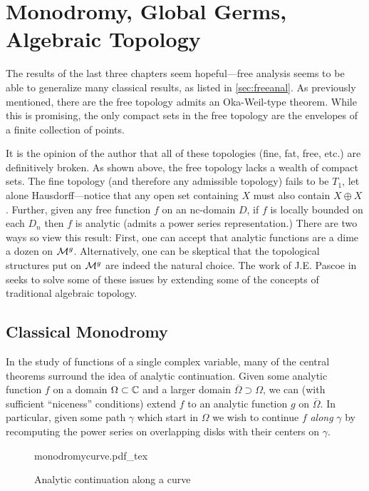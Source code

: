 \chapter{Monodromy, Global Germs, Algebraic Topology}\label{ch:monodromy}

The results of the last three chapters seem hopeful---free analysis seems to be
able to generalize many classical results, as listed in \cref{sec:freeanal}. As
previously mentioned, there are the free topology admits an Oka-Weil-type theorem.
While this is promising, the only compact sets in the free topology are the
envelopes of a finite collection of points.

It is the opinion of the author that all of these topologies (fine, fat, free,
etc.) are definitively
broken. As shown above, the free topology lacks a wealth of compact sets.
The fine topology (and therefore any admissible topology)
fails to be \(T_1\), let alone Hausdorff---notice that any open set containing
\(X\) must also contain \(X\oplus X\). Further, given any free function \(f\)
on an nc-domain \(D\), if \(f\) is locally bounded on each \(D_n\) then \(f\)
is analytic (admits a power series representation.) There are two ways so view
this result: First, one can accept that analytic functions are a dime a dozen on
\(\mathcal{M}^{g} \). Alternatively, one can be skeptical that the topological
structures put on \(\mathcal{M}^{g} \) are indeed the natural choice. The work of J.E.
Pascoe in \cite{pascoeFreeNoncommutativePrincipal2020} seeks to solve some of
these issues by extending some of the concepts of traditional algebraic
topology.

\section{Classical Monodromy}%
\label{sec:classmono}

In the study of functions of a single complex variable, many of the central
theorems surround the idea of analytic continuation. Given some analytic
function \(f\) on a domain \(\Omega \subset\mathbb{C} \) and a larger domain
\(\overline{\Omega} \supset \Omega\), we can (with sufficient
``niceness'' conditions) extend \(f\) to an analytic function \(g\) on
\(\overline{\Omega}\). In particular, given some path \(\gamma\) which start in
\(\Omega\) we wish to continue \(f\) \emph{along} \(\gamma\) by recomputing the
power series on overlapping disks with their centers on \(\gamma\).
\begin{figure}[h!]
\centering
  \def\svgwidth{0.8\columnwidth}
  {monodromycurve.pdf_tex}
\caption{Analytic continuation along a curve}
\label{fig:monocurve}
\end{figure}

